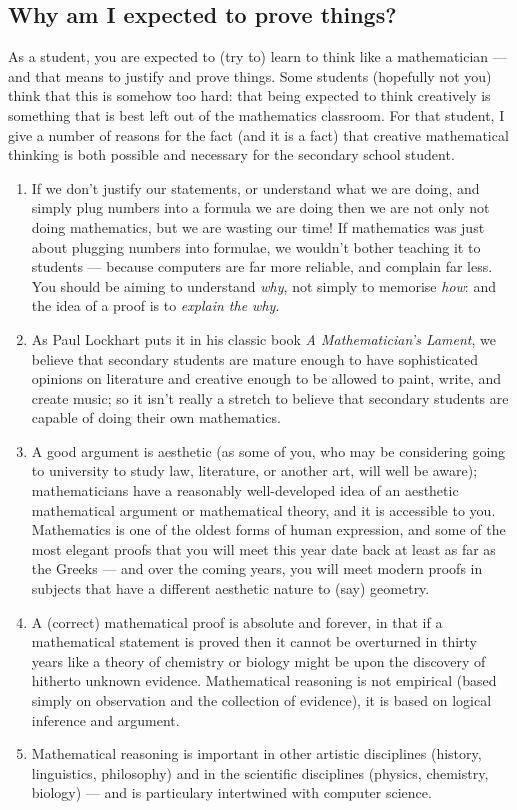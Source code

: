 \subsection*{Why am I expected to prove things?}
As a student, you are expected to (try to) learn to think like a mathematician --- and that means to
justify and prove things. Some students (hopefully not you) think that this is somehow too
hard: that being expected to think creatively is something that is best left out of the mathematics
classroom. For that student, I give a number of reasons for the fact (and it is a fact) that
creative mathematical thinking is both possible and necessary for the secondary school student.
\begin{enumerate}
  \item If we don't justify our statements, or understand what we are doing, and simply plug numbers
        into a formula we are doing then we are not only not doing mathematics, but we are wasting
        our time! If mathematics was just about plugging numbers into formulae, we wouldn't bother
        teaching it to students --- because computers are far more reliable, and complain far less. You
        should be aiming to understand \emph{why}, not simply to memorise \emph{how}: and the idea
        of a proof is to \emph{explain the why}.
  \item As Paul Lockhart puts it in his classic book \textit{A Mathematician's Lament}, we believe that
        secondary students are mature enough to have sophisticated opinions on literature and creative
        enough to be allowed to paint, write, and create music; so it isn't really a stretch to believe
        that secondary students are capable of doing their own mathematics.
  \item A good argument is aesthetic (as some of you, who may be considering going to university to study law,
        literature, or another art, will well be aware); mathematicians have a reasonably well-developed idea
        of an aesthetic mathematical argument or mathematical theory, and it is accessible to you. Mathematics
        is one of the oldest forms of human expression, and some of the most elegant proofs that you will
        meet this year date back at least as far as the Greeks --- and over the coming years, you will meet
        modern proofs in subjects that have a different aesthetic nature to (say) geometry.
  \item A (correct) mathematical proof is absolute and forever, in that if a mathematical statement is proved
        then it cannot be overturned in thirty years like a theory of chemistry or biology might be upon the
        discovery of hitherto unknown evidence. Mathematical reasoning is not empirical (based simply on observation
        and the collection of evidence), it is based on logical inference and argument.
  \item Mathematical reasoning is important in other artistic disciplines (history, linguistics, philosophy) and
        in the scientific disciplines (physics, chemistry, biology) --- and is particulary intertwined with
        computer science.
\end{enumerate}


